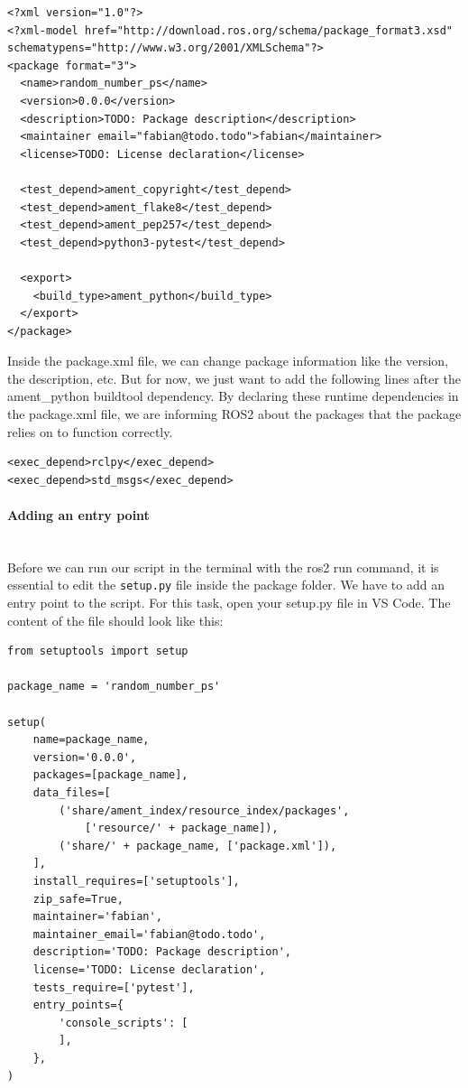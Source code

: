 \documentclass{article}
\begin{document}
    \noindent
    
\begin{lstlisting}[caption={\texttt{package.xml file}}, captionpos=b]   
<?xml version="1.0"?>
<?xml-model href="http://download.ros.org/schema/package_format3.xsd" 
schematypens="http://www.w3.org/2001/XMLSchema"?>
<package format="3">
  <name>random_number_ps</name>
  <version>0.0.0</version>
  <description>TODO: Package description</description>
  <maintainer email="fabian@todo.todo">fabian</maintainer>
  <license>TODO: License declaration</license>

  <test_depend>ament_copyright</test_depend>
  <test_depend>ament_flake8</test_depend>
  <test_depend>ament_pep257</test_depend>
  <test_depend>python3-pytest</test_depend>

  <export>
    <build_type>ament_python</build_type>
  </export>
</package>
\end{lstlisting}

\noindent
Inside the package.xml file, we can change package information like the version, the description, etc. But for now, we just want to add the following lines after the ament\_python buildtool dependency. By declaring these runtime dependencies in the package.xml file, we are informing ROS2 about the packages that the package relies on to function correctly. 

\begin{lstlisting}
<exec_depend>rclpy</exec_depend>
<exec_depend>std_msgs</exec_depend>
\end{lstlisting}
    
\paragraph{Adding an entry point}~\\
Before we can run our script in the terminal with the ros2 run command, it is essential to edit the \texttt{setup.py} file inside the package folder. We have to add an entry point to the script.
For this task, open your setup.py file in VS Code. The content of the file should look like this:

\begin{verbatim}
from setuptools import setup

package_name = 'random_number_ps'

setup(
    name=package_name,
    version='0.0.0',
    packages=[package_name],
    data_files=[
        ('share/ament_index/resource_index/packages',
            ['resource/' + package_name]),
        ('share/' + package_name, ['package.xml']),
    ],
    install_requires=['setuptools'],
    zip_safe=True,
    maintainer='fabian',
    maintainer_email='fabian@todo.todo',
    description='TODO: Package description',
    license='TODO: License declaration',
    tests_require=['pytest'],
    entry_points={ 
        'console_scripts': [
        ],
    },
)
\end{verbatim}
\end{document}
